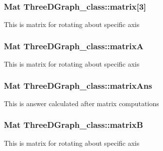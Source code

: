 \subsubsection[{\texorpdfstring{matrix}{matrix}}]{\setlength{\rightskip}{0pt plus 5cm}Mat Three\+D\+Graph\+\_\+class\+::matrix\mbox{[}3\mbox{]}}\hypertarget{classThreeDGraph__class_a276acab9cffc9952e64514aad293da84}{}\label{classThreeDGraph__class_a276acab9cffc9952e64514aad293da84}
This is matrix for rotating about specific axis 
\subsubsection[{\texorpdfstring{matrixA}{matrixA}}]{\setlength{\rightskip}{0pt plus 5cm}Mat Three\+D\+Graph\+\_\+class\+::matrixA}\hypertarget{classThreeDGraph__class_a03032b7bde495a752d3ccf43c3328f78}{}\label{classThreeDGraph__class_a03032b7bde495a752d3ccf43c3328f78}
This is matrix for rotating about specific axis 
\subsubsection[{\texorpdfstring{matrix\+Ans}{matrixAns}}]{\setlength{\rightskip}{0pt plus 5cm}Mat Three\+D\+Graph\+\_\+class\+::matrix\+Ans}\hypertarget{classThreeDGraph__class_a52564aaa0f2223a754dccb28b347b009}{}\label{classThreeDGraph__class_a52564aaa0f2223a754dccb28b347b009}
This is answer calculated after matrix computations 
\subsubsection[{\texorpdfstring{matrixB}{matrixB}}]{\setlength{\rightskip}{0pt plus 5cm}Mat Three\+D\+Graph\+\_\+class\+::matrixB}\hypertarget{classThreeDGraph__class_a487c0f52b65d943a04cf75077ab6b5fe}{}\label{classThreeDGraph__class_a487c0f52b65d943a04cf75077ab6b5fe}
This is matrix for rotating about specific axis 
